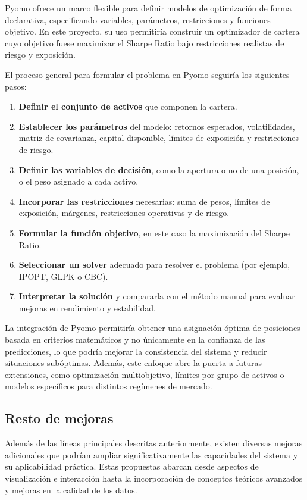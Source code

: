 Pyomo ofrece un marco flexible para definir modelos de optimización de forma declarativa, especificando variables, parámetros, restricciones y
funciones objetivo. En este proyecto, su uso permitiría construir un optimizador de cartera cuyo objetivo fuese maximizar el Sharpe Ratio bajo
restricciones realistas de riesgo y exposición.

El proceso general para formular el problema en Pyomo seguiría los siguientes pasos:

\begin{enumerate}
\item \textbf{Definir el conjunto de activos} que componen la cartera.
\item \textbf{Establecer los parámetros} del modelo: retornos esperados, volatilidades, matriz de covarianza, capital disponible, límites de
exposición y restricciones de riesgo.
\item \textbf{Definir las variables de decisión}, como la apertura o no de una posición, o el peso asignado a cada activo.
\item \textbf{Incorporar las restricciones} necesarias: suma de pesos, límites de exposición, márgenes, restricciones operativas y de riesgo.
\item \textbf{Formular la función objetivo}, en este caso la maximización del Sharpe Ratio.
\item \textbf{Seleccionar un solver} adecuado para resolver el problema (por ejemplo, IPOPT, GLPK o CBC).
\item \textbf{Interpretar la solución} y compararla con el método manual para evaluar mejoras en rendimiento y estabilidad.
\end{enumerate}

La integración de Pyomo permitiría obtener una asignación óptima de posiciones basada en criterios matemáticos y no únicamente en la confianza de las
predicciones, lo que podría mejorar la consistencia del sistema y reducir situaciones subóptimas. Además, este enfoque abre la puerta a futuras
extensiones, como optimización multiobjetivo, límites por grupo de activos o modelos específicos para distintos regímenes de mercado.

\subsection{Resto de mejoras}

Además de las líneas principales descritas anteriormente, existen diversas mejoras adicionales que podrían ampliar significativamente las capacidades
del sistema y su aplicabilidad práctica. Estas propuestas abarcan desde aspectos de visualización e interacción hasta la incorporación de conceptos
teóricos avanzados y mejoras en la calidad de los datos.

